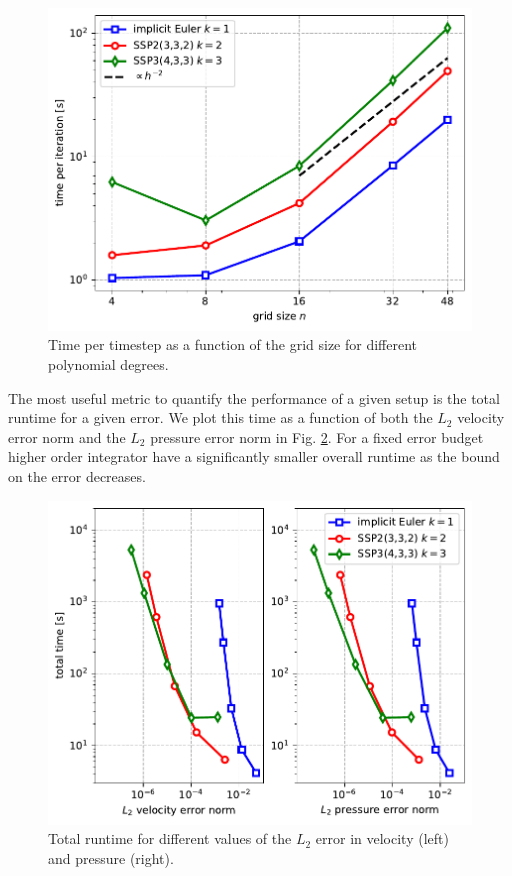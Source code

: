 \documentclass[11pt]{article}
\begin{document}
\begin{figure}
    \begin{center}
        \includegraphics[width=0.75\linewidth]{figures/titer.pdf}
        \caption{Time per timestep as a function of the grid size for different polynomial degrees.}
        \label{fig:titer}
    \end{center}
\end{figure}
The most useful metric to quantify the performance of a given setup is the total runtime for a given error. We plot this time as a function of both the $L_2$ velocity error norm and the $L_2$ pressure error norm in Fig. \ref{fig:ttotal}. For a fixed error budget higher order integrator have a significantly smaller overall runtime as the bound on the error decreases.
\begin{figure}
    \begin{center}
        \includegraphics[width=0.75\linewidth]{figures/ttotal.pdf}
        \caption{Total runtime for different values of the $L_2$ error in velocity (left) and pressure (right).}
        \label{fig:ttotal}
    \end{center}
\end{figure}
\clearpage
\appendix
\end{document}
